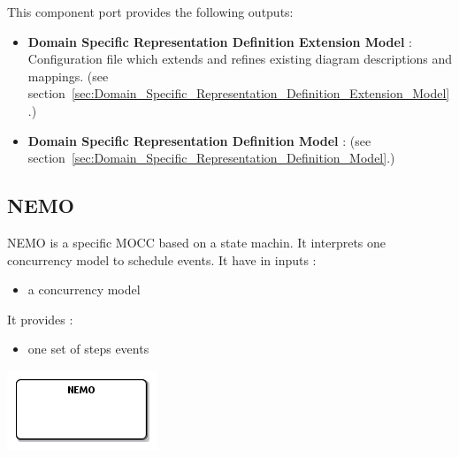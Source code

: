 \documentclass{gemoc} %
\begin{document}
This component port provides the following outputs:
\begin{itemize}
  \item \textbf{Domain Specific Representation Definition Extension Model} :
Configuration file which extends and refines existing diagram descriptions and mappings.
(see section~\ref{sec:Domain_Specific_Representation_Definition_Extension_Model}.)
  \item \textbf{Domain Specific Representation Definition Model} :
(see section~\ref{sec:Domain_Specific_Representation_Definition_Model}.)
\end{itemize}




\subsection{NEMO}
\label{sec:NEMO}

NEMO is a specific MOCC based on a state machin. It interprets one concurrency model to schedule events.
\newline It have in inputs :
\begin{itemize}
\item a concurrency model
\end{itemize}
It provides :
\begin{itemize}
\item one set of steps events
\end{itemize}
\begin{center}
\includegraphics*[trim=0.0cm 0.0cm 0cm 0.0cm, clip=true]{../images/generated/Generated_NEMO.png}
\end{center}
\end{document}
